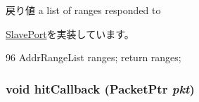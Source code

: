 \begin{DoxyReturn}{戻り値}
a list of ranges responded to 
\end{DoxyReturn}


\hyperlink{classSlavePort_a6e967f8921e80748eb2be35b6b481a7e}{SlavePort}を実装しています。


\begin{DoxyCode}
96         { AddrRangeList ranges; return ranges; }
\end{DoxyCode}
\hypertarget{classRubyPort_1_1MemSlavePort_a24a8f9c1806a15d53eddd6a70d9b3e31}{
\subsubsection[{hitCallback}]{\setlength{\rightskip}{0pt plus 5cm}void hitCallback ({\bf PacketPtr} {\em pkt})}}
\label{classRubyPort_1_1MemSlavePort_a24a8f9c1806a15d53eddd6a70d9b3e31}



